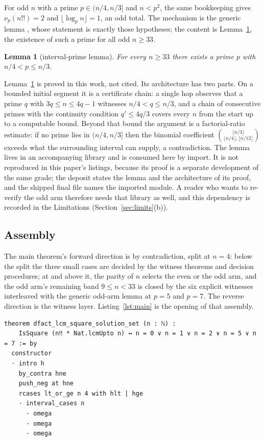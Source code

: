 \documentclass[11pt]{article}
\newtheorem{lemma}[theorem]{Lemma}
\theoremstyle{definition}
\begin{document}
For odd $n$ with a prime $p \in (n/4, n/3]$ and $n < p^2$, the same bookkeeping
gives $\nu_p(n!!) = 2$ and $\lfloor \log_p n \rfloor = 1$, an odd total. The
mechanism is the generic lemma ,
whose statement is exactly those hypotheses; the content is
Lemma~\ref{lem:B}, the existence of such a prime for all odd $n \ge 33$.

\begin{lemma}[interval-prime lemma]\label{lem:B}
For every $n \ge 33$ there exists a prime $p$ with $n/4 < p \le n/3$.
\end{lemma}

Lemma~\ref{lem:B} is proved in this work, not cited. Its architecture has two
parts. On a bounded initial segment it is a certificate chain: a single hop
observes that a prime $q$ with $3q \le n \le 4q - 1$ witnesses
$n/4 < q \le n/3$, and a chain of consecutive primes with the continuity
condition $q' \le 4q/3$ covers every $n$ from the start up to a computable
bound. Beyond that bound the argument is a factorial-ratio estimate: if no
prime lies in $(n/4, n/3]$ then the binomial coefficient
$\binom{\lfloor n/3 \rfloor}{\lfloor n/4 \rfloor, \lfloor n/12 \rfloor}$
exceeds what the surrounding interval can supply, a contradiction. The lemma
lives in an accompanying library and is consumed here by import. It is not
reproduced in this paper's listings, because its proof is a separate
development of the same grade; the deposit states the lemma and the architecture
of its proof, and the shipped final file names the imported module. A reader who
wants to re-verify the odd arm therefore needs that library as well, and this
dependency is recorded in the Limitations (Section~\ref{sec:limits}(b)).

\subsection{Assembly}

The main theorem's forward direction is by contradiction, split at $n = 4$:
below the split the three small cases are decided by the witness theorems and
decision procedures; at and above it, the parity of $n$ selects the even or
the odd arm, and the odd arm's remaining band $9 \le n < 33$ is closed by the
six explicit witnesses interleaved with the generic odd-arm lemma at $p = 5$
and $p = 7$. The reverse direction is the witness layer.
Listing~\ref{lst:main} is the opening of that assembly.

\begin{lstlisting}[caption={The main theorem's assembly: the forward direction's
case split, from the contradiction to the two arms.},label={lst:main}]
theorem dfact_lcm_square_solution_set (n : ℕ) :
    IsSquare (n‼ * Nat.lcmUpto n) ↔ n = 0 ∨ n = 1 ∨ n = 2 ∨ n = 5 ∨ n = 7 := by
  constructor
  · intro h
    by_contra hne
    push_neg at hne
    rcases lt_or_ge n 4 with hlt | hge
    · interval_cases n
      · omega
      · omega
      · omega
\end{lstlisting}
\end{document}
